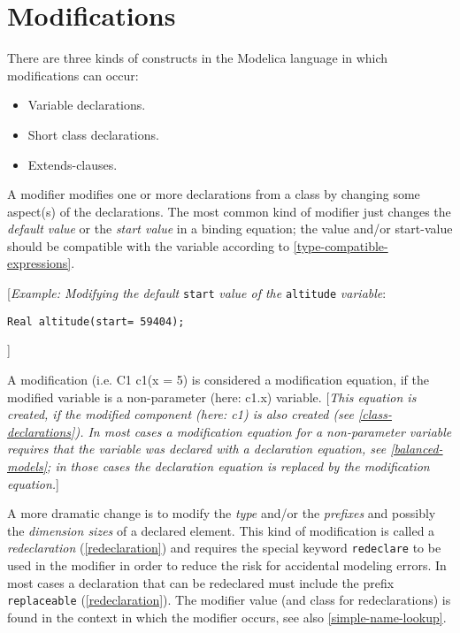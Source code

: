 \section{Modifications}

There are three kinds of constructs in the Modelica language in which
modifications can occur:

\begin{itemize}
\item
  Variable declarations.
\item
  Short class declarations.
\item
  Extends-clauses.
\end{itemize}

A modifier modifies one or more declarations from a class by changing
some aspect(s) of the declarations. The most common kind of modifier
just changes the \emph{default value} or the \emph{start value} in a
binding equation; the value and/or start-value should be compatible with
the variable according to \autoref{type-compatible-expressions}.

{[}\emph{Example: Modifying the default} \lstinline[basicstyle=\ttfamily]!start! \emph{value of the}
\lstinline[basicstyle=\ttfamily]!altitude! \emph{variable}:
\begin{lstlisting}[language=modelica]
Real altitude(start= 59404);
\end{lstlisting}
{]}

A modification (i.e. C1 c1(x = 5) is considered a modification equation,
if the modified variable is a non-parameter (here: c1.x) variable.
{[}\emph{This equation is created, if the modified component (here: c1)
is also created (see \autoref{class-declarations}). In most cases a
modification equation for a non-parameter variable requires that the
variable was declared with a declaration equation, see \autoref{balanced-models};
in those cases the declaration equation is replaced by the
modification equation.}{]}

A more dramatic change is to modify the \emph{type} and/or the
\emph{prefixes} and possibly the \emph{dimension sizes} of a declared
element. This kind of modification is called a \emph{redeclaration}
(\autoref{redeclaration}) and requires the special keyword \lstinline[basicstyle=\ttfamily]!redeclare! to be used in
the modifier in order to reduce the risk for accidental modeling errors.
In most cases a declaration that can be redeclared must include the
prefix \lstinline[basicstyle=\ttfamily]!replaceable! (\autoref{redeclaration}). The modifier value (and class for
redeclarations) is found in the context in which the modifier occurs,
see also \autoref{simple-name-lookup}.

